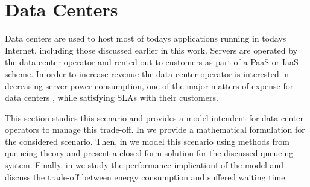 \section{Data Centers}\label{sec:cloud:data_centers}
Data centers are used to host most of todays applications running in todays Internet, including those discussed earlier in this work.
Servers are operated by the data center operator and rented out to customers as part of a \gls{PaaS} or \gls{IaaS} scheme.
In order to increase revenue the data center operator is interested in decreasing server power consumption, one of the major matters of expense for data centers \cite{Greenberg2009b}, while satisfying \glspl{SLA} with their customers.

This section studies this scenario and provides a model intendent for data 	center operators to manage this trade-off.
In  we provide a mathematical formulation for the considered scenario.
Then, in  we model this scenario using methods from queueing theory and present a closed form solution for the discussed queueing system.
Finally, in  we study the performance implicationf of the model and discuss the trade-off between energy consumption and suffered waiting time.




